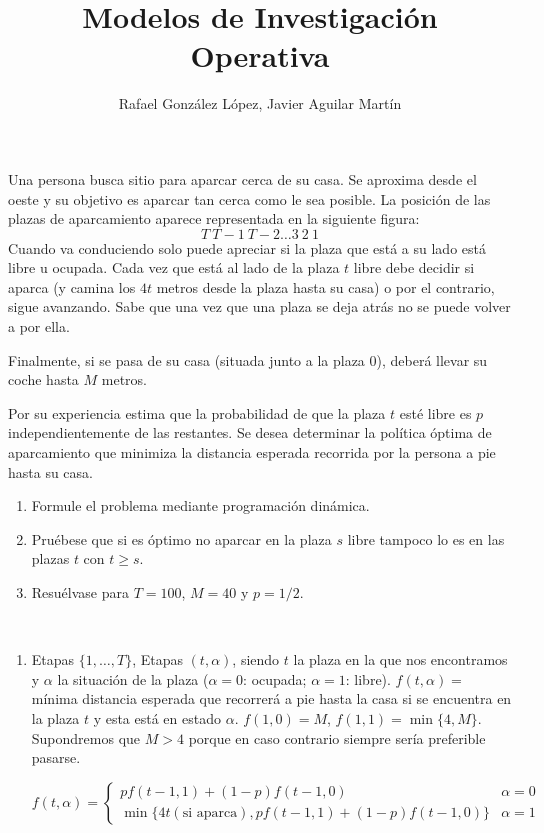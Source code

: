 \documentclass[twoside]{article}
\begin{document}
\title{Modelos de Investigación Operativa}
\author{Rafael González López, Javier Aguilar Martín}
\maketitle

\begin{ejercicio}{1}
Una persona busca sitio para aparcar cerca de su casa. Se aproxima desde el oeste y su objetivo es aparcar tan cerca como le sea posible. La posición de las plazas de aparcamiento aparece representada en la siguiente figura:
$$T\ T-1\ T-2\dots 3\ 2\ 1$$
Cuando va conduciendo solo puede apreciar si la plaza que está a su lado está libre u ocupada. Cada vez que está al lado de la plaza $t$ libre debe decidir si aparca (y camina los $4t$ metros desde la plaza hasta su casa) o por el contrario, sigue avanzando. Sabe que una vez que una plaza se deja atrás no se puede volver a por ella. 

Finalmente, si se pasa de su casa (situada junto a la plaza 0), deberá llevar su coche hasta $M$ metros.

Por su experiencia estima que la probabilidad de que la plaza $t$ esté libre es $p$ independientemente de las restantes. Se desea determinar la política óptima de aparcamiento que minimiza la distancia esperada recorrida por la persona a pie hasta su casa.
\begin{enumerate}
\item Formule el problema mediante programación dinámica.
\item Pruébese que si es óptimo no aparcar en la plaza $s$ libre tampoco lo es en las plazas $t$ con $t\geq s$.
\item Resuélvase para $T=100$, $M=40$ y $p=1/2$.
\end{enumerate}
\begin{solucion}\
\begin{enumerate}

\item Etapas $\{1,\dots, T\}$, Etapas $(t,\alpha)$, siendo $t$ la plaza en la que nos encontramos y $\alpha$ la situación de la plaza ($\alpha=0$: ocupada; $\alpha=1$: libre). $f(t,\alpha)=$ mínima distancia esperada que recorrerá a pie hasta la casa si se encuentra en la plaza $t$ y esta está en estado $\alpha$. $f(1,0)=M$, $f(1,1)=\min\{4,M\}$. Supondremos que $M>4$ porque en caso contrario siempre sería preferible pasarse.

$$f(t,\alpha)=\begin{cases}
 pf(t-1,1)+(1-p)f(t-1,0)& \alpha=0\\
 \min\{4t (\text{si aparca}),pf(t-1,1)+(1-p)f(t-1,0)\} & \alpha=1
\end{cases}$$


\end{enumerate}
\end{solucion}
\end{ejercicio}
\end{document}

